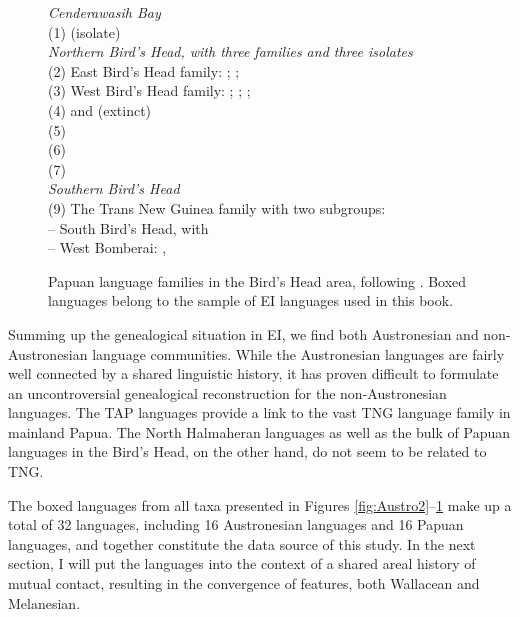 \begin{figure}[ht]
{\raggedright%
\begin{footnotesize}
\textit{Cenderawasih Bay} \\
(1)  (isolate) \bigskip\\
\textit{Northern Bird’s Head, with three families and three isolates} \\
(2) East Bird’s Head family: ; ;  \\
(3) West Bird’s Head family: ; ; ;  \\
(4)  and (extinct)  \\
(5)  \\
(6)  \\
(7)  \bigskip\\
\textit{Southern Bird’s Head} \\
(9) The Trans New Guinea family with two subgroups: \\
– South Bird’s Head, with  \\
– West Bomberai: ,  \\
\end{footnotesize}}
\caption[The Papuan languages of the Bird's Head]{Papuan language families in the Bird's Head area, following \citet{klamer2008east}. Boxed languages belong to the sample of EI languages used in this book.}\label{fig:westpapuan}
\end{figure}

Summing up the genealogical situation in EI, we find both Austronesian and non-Austronesian language communities. While the Austronesian languages are fairly well connected by a shared linguistic history, it has proven difficult to formulate an uncontroversial genealogical reconstruction for the non-Austronesian languages. The TAP languages provide a link to the vast TNG language family in mainland Papua. The North Halmaheran languages as well as the bulk of Papuan languages in the Bird's Head, on the other hand, do not seem to be related to TNG. 

The boxed languages from all taxa presented in Figures \ref{fig:Austro2}--\ref{fig:westpapuan} make up a total of 32 languages, including 16 Austronesian languages and 16 Papuan languages, and together constitute the data source of this study. In the next section, I will put the languages into the context of a shared areal history of mutual contact, resulting in the convergence of features, both Wallacean and Melanesian.

